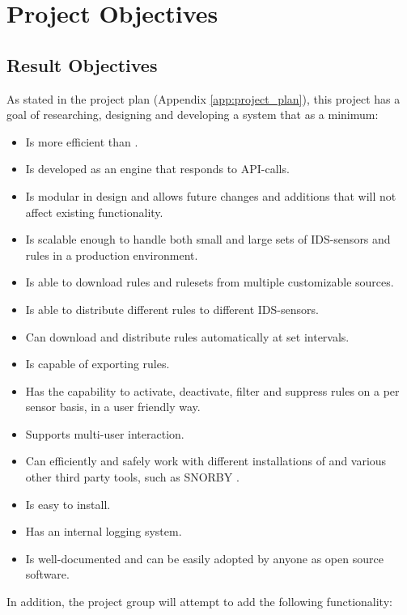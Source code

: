 \section{Project Objectives}
\label{sec:project_objectives}
\subsection{Result Objectives}
As stated in the project plan (Appendix \ref{app:project_plan}), this project
has a goal of researching, designing and developing a system that as a minimum:

\begin{itemize} 
\item Is more efficient than \bhtb{}.
\item Is developed as an engine that responds to API-calls.
\item Is modular in design and allows future changes and additions that will not
affect existing functionality.
\item Is scalable enough to handle both small and large sets of IDS-sensors and
rules in a production environment.
\item Is able to download rules and rulesets from multiple customizable sources.
\item Is able to distribute different rules to different IDS-sensors.
\item Can download and distribute rules automatically at set intervals.
\item Is capable of exporting rules.
\item Has the capability to activate, deactivate, filter and suppress rules on a
per sensor basis, in a user friendly way.
\item Supports multi-user interaction.
\item Can efficiently and safely work with different installations of \snort{} and various
other third party tools, such as SNORBY \cite{snorby}.
\item Is easy to install.
\item Has an internal logging system.
\item Is well-documented and can be easily adopted by anyone as open source
software.
\end{itemize}
In addition, the project group will attempt to add the following functionality:

